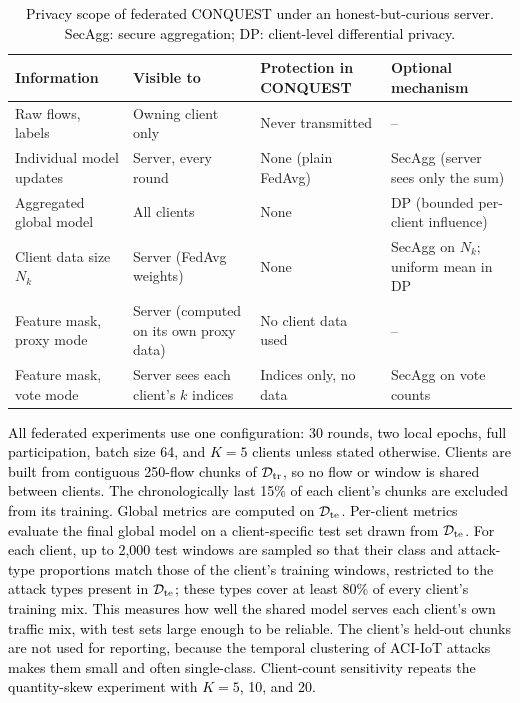 \documentclass[conference]{IEEEtran}
\begin{document}
\begin{table}[!t]
\centering
\scriptsize
\caption{\textcolor{black}{Privacy scope of federated CONQUEST
under an honest-but-curious server. SecAgg: secure aggregation; DP:
client-level differential privacy.}}
\label{tab:privacy_scope}
\setlength{\tabcolsep}{3pt}
\renewcommand{\arraystretch}{1.08}
\begin{tabular}{p{1.7cm} p{1.6cm} p{1.75cm} p{1.75cm}}
\hline\toprule
\textbf{Information} & \textbf{Visible to} & \textbf{Protection in CONQUEST} & \textbf{Optional mechanism} \\
\hline\toprule
Raw flows, labels & Owning client only & Never transmitted & -- \\
Individual model updates & Server, every round & None (plain FedAvg) & SecAgg (server sees only the sum) \\
Aggregated global model & All clients & None & DP (bounded per-client influence) \\
Client data size $N_k$ & Server (FedAvg weights) & None & SecAgg on $N_k$; uniform mean in DP \\
Feature mask, proxy mode & Server (computed on its own proxy data) & No client data used & -- \\
Feature mask, vote mode & Server sees each client's $k$ indices & Indices only, no data & SecAgg on vote counts \\
\hline\toprule
\end{tabular}
\end{table}

\textcolor{black}{All federated experiments use one
configuration: 30 rounds, two local epochs, full participation, batch
size 64, and $K=5$ clients unless stated otherwise. Clients are built
from contiguous 250-flow chunks of $\mathcal{D}_{\rm tr}$, so no flow
or window is shared between clients. The chronologically last 15\% of
each client's chunks are excluded from its training. Global metrics
are computed on $\mathcal{D}_{\rm te}$.}
\textcolor{black}{Per-client metrics
evaluate the final global model on a client-specific test set drawn
from $\mathcal{D}_{\rm te}$. For each client, up to 2{,}000 test
windows are sampled so that their class and attack-type proportions
match those of the client's training windows, restricted to the
attack types present in $\mathcal{D}_{\rm te}$; these types cover at
least 80\% of every client's training mix. This measures how well the
shared model serves each client's own traffic mix, with test sets
large enough to be reliable. The client's held-out chunks are not
used for reporting, because the temporal clustering of ACI-IoT
attacks makes them small and often single-class. Client-count
sensitivity repeats the quantity-skew experiment with $K=5$, 10, and
20.}
\end{document}
